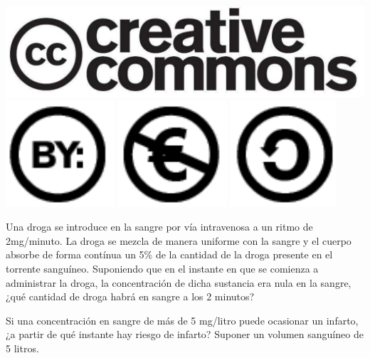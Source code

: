 \documentclass[aspectratio=149,10pt,xcolor=dvipsnames,t]{beamer}
\begin{document}
\begin{frame}[c]
\begin{center}
\biskip
\includegraphics[scale=0.07]{img/cc-logo}
\includegraphics[scale=0.2]{img/cc-by}
\includegraphics[scale=0.2]{img/cc-e}
\includegraphics[scale=0.2]{img/cc-c}
\end{center}
\end{frame}

\begin{frame}[c]
\Large
Una droga se introduce en la sangre por vía intravenosa a un ritmo de 2mg/minuto. La droga se mezcla de
manera uniforme con la sangre y el cuerpo absorbe de forma contínua un 5\% de la cantidad de la droga presente en el torrente
sanguíneo. Suponiendo que en el instante en  que se comienza a administrar la droga, la concentración de dicha sustancia
era nula en la sangre, ¿qué cantidad de droga habrá en sangre a los 2 minutos? 

Si una concentración en sangre de más de 5 mg/litro puede ocasionar un infarto, ¿a partir de qué instante hay riesgo de
infarto? Suponer un volumen sanguíneo de 5 litros.
\end{frame}
\end{document}

